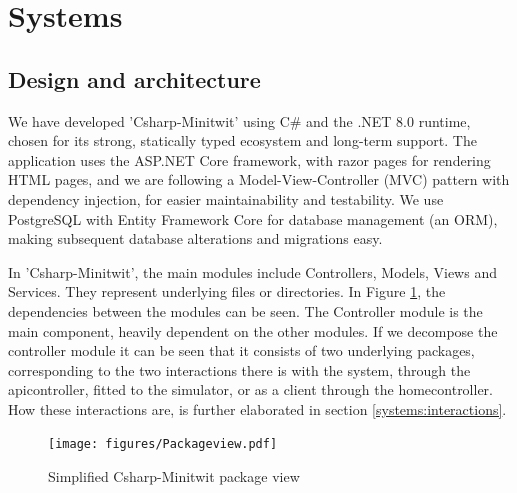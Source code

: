 \section{Systems}
\subsection{Design and architecture} \label{Design of the CSharp-MiniTwit application}


We have developed 'Csharp-Minitwit' using C\# and the .NET 8.0 runtime, chosen for its strong, statically typed ecosystem and long-term support.\cite{netcoresupport} The application uses the ASP.NET Core framework\cite{aspnetcoreintro2023}, with razor pages for rendering HTML pages, and we are following a Model-View-Controller (MVC) pattern with dependency injection, for easier maintainability and testability. We use PostgreSQL with Entity Framework Core for database management (an ORM), making subsequent database alterations and migrations easy.  

In 'Csharp-Minitwit', the main modules include Controllers, Models, Views and Services. They represent underlying files or directories.  In Figure \ref{fig:packageview}, the dependencies between the modules can be seen. The Controller module is the main component, heavily dependent on the other modules. If we decompose the controller module it can be seen that it consists of two underlying packages, corresponding to the two interactions there is with the system, through the apicontroller, fitted to the simulator, or as a client through the homecontroller. How these interactions are, is further elaborated in section \ref{systems:interactions}. 

\begin{figure}[H]
    \centering
    \texttt{[image: figures/Packageview.pdf]}
    \caption{Simplified Csharp-Minitwit package view}
    \label{fig:packageview}
\end{figure}

